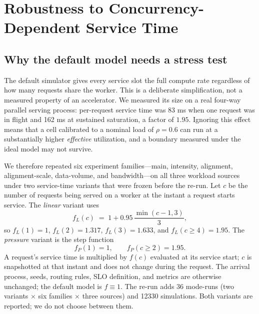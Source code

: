 \section{Robustness to Concurrency-Dependent Service Time}
\label{sec:calibrated}

\subsection{Why the default model needs a stress test}
The default simulator gives every service slot the full compute rate regardless of how many
requests share the worker. This is a deliberate simplification, not a measured property of an
accelerator. We measured its size on a real four-way parallel serving process: per-request service
time was 83 ms when one request was in flight and 162 ms at
sustained saturation, a factor of $1.95$. Ignoring this effect means that a cell calibrated to a
nominal load of $\rho=0.6$ can run at a substantially higher \emph{effective} utilization, and a
boundary measured under the ideal model may not survive.

We therefore repeated six experiment families---main, intensity, alignment, alignment-scale,
data-volume, and bandwidth---on all three workload sources under two service-time variants that
were frozen before the re-run. Let $c$ be the number of requests being served on a worker at the
instant a request starts service. The \emph{linear} variant uses
\begin{equation}
  f_L(c) \;=\; 1 + 0.95\,\frac{\min(c-1,3)}{3},
  \label{eq:flinear}
\end{equation}
so $f_L(1)=1$, $f_L(2)=1.317$, $f_L(3)=1.633$, and $f_L(c\ge4)=1.95$. The \emph{pressure} variant is
the step function
\begin{equation}
  f_P(1)=1, \qquad f_P(c\ge2)=1.95 .
  \label{eq:fpressure}
\end{equation}
A request's service time is multiplied by $f(c)$ evaluated at its service start; $c$ is snapshotted
at that instant and does not change during the request. The arrival process, seeds, routing rules,
SLO definition, and metrics are otherwise unchanged; the default model is $f\equiv1$. The re-run
adds $36$ mode-runs (two variants $\times$ six families $\times$ three sources) and
12330 simulations. Both variants are reported; we do not choose between them.


